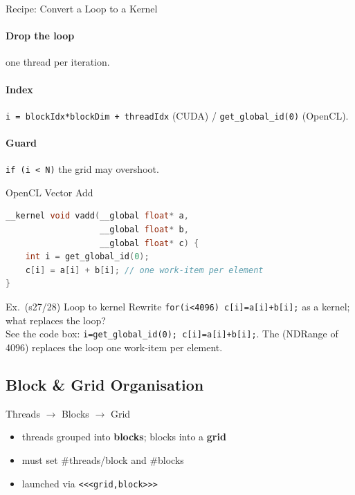 \begin{KR}{Recipe: Convert a Loop to a Kernel}
    \paragraph{Drop the loop} one thread per iteration.
    \paragraph{Index} \texttt{i = blockIdx*blockDim + threadIdx} (CUDA) / \texttt{get\_global\_id(0)} (OpenCL).
    \paragraph{Guard} \texttt{if (i < N)} the grid may overshoot.
\end{KR}


\begin{examplecode}{OpenCL Vector Add}
\begin{lstlisting}[language=C, style=basesmol]
__kernel void vadd(__global float* a,
                   __global float* b,
                   __global float* c) {
    int i = get_global_id(0);
    c[i] = a[i] + b[i]; // one work-item per element
}
\end{lstlisting}
\end{examplecode}




\begin{example2}{Ex.\ (s27/28) Loop to kernel}
    Rewrite \texttt{for(i<4096) c[i]=a[i]+b[i];} as a kernel; what replaces the loop?
     \\ 
    See the code box: \texttt{i=get\_global\_id(0); c[i]=a[i]+b[i];}. The  (NDRange of 4096) replaces the loop one work-item per element.
\end{example2}

\multend

\subsection{Block \& Grid Organisation}


\begin{definition}{Threads $\to$ Blocks $\to$ Grid}
    \begin{itemize}
        \item threads grouped into \textbf{blocks}; blocks into a \textbf{grid}
        \item must set \#threads/block and \#blocks
        \item launched via \texttt{<<<grid,block>>>}
    \end{itemize}
\end{definition}

